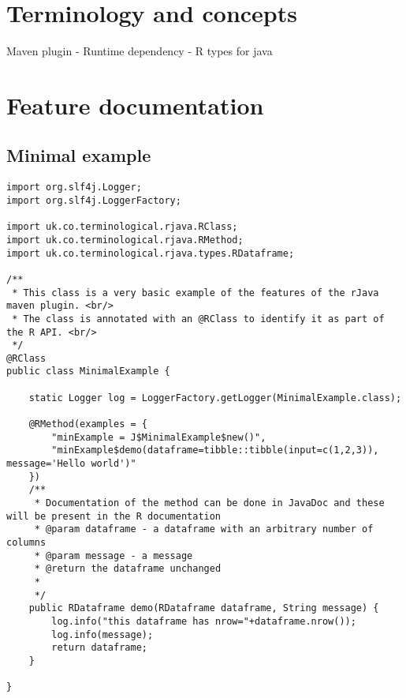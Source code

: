 \hypertarget{terminology-and-concepts}{%
\section{Terminology and concepts}\label{terminology-and-concepts}}

Maven plugin - Runtime dependency - R types for java

\hypertarget{feature-documentation}{%
\section{Feature documentation}\label{feature-documentation}}

\hypertarget{minimal-example}{%
\subsection{Minimal example}\label{minimal-example}}

\begin{verbatim}
import org.slf4j.Logger;
import org.slf4j.LoggerFactory;

import uk.co.terminological.rjava.RClass;
import uk.co.terminological.rjava.RMethod;
import uk.co.terminological.rjava.types.RDataframe;

/**
 * This class is a very basic example of the features of the rJava maven plugin. <br/>
 * The class is annotated with an @RClass to identify it as part of the R API. <br/>
 */
@RClass
public class MinimalExample {

    static Logger log = LoggerFactory.getLogger(MinimalExample.class);
    
    @RMethod(examples = {
        "minExample = J$MinimalExample$new()",
        "minExample$demo(dataframe=tibble::tibble(input=c(1,2,3)), message='Hello world')"
    })
    /**
     * Documentation of the method can be done in JavaDoc and these will be present in the R documentation 
     * @param dataframe - a dataframe with an arbitrary number of columns
     * @param message - a message
     * @return the dataframe unchanged
     *  
     */
    public RDataframe demo(RDataframe dataframe, String message) {
        log.info("this dataframe has nrow="+dataframe.nrow());
        log.info(message);
        return dataframe;
    }
    
}
\end{verbatim}


